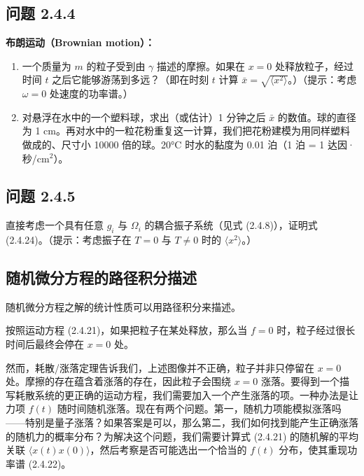 \subsection*{问题 2.4.4}

\textbf{布朗运动（Brownian motion）：}
\begin{enumerate}
\item[(a)] 一个质量为 $m$ 的粒子受到由 $\gamma$ 描述的摩擦。如果在 $x = 0$ 处释放粒子，经过时间 $t$ 之后它能够游荡到多远？（即在时刻 $t$ 计算 $\bar{x} = \sqrt{\langle x^2\rangle}$。）（提示：考虑 $\omega = 0$ 处速度的功率谱。）
\item[(b)] 对悬浮在水中的一个塑料球，求出（或估计）1 分钟之后 $\bar{x}$ 的数值。球的直径为 1 cm。再对水中的一粒花粉重复这一计算，我们把花粉建模为用同样塑料做成的、尺寸小 10000 倍的球。20°C 时水的黏度为 0.01 泊（1 泊 = 1 达因·秒/cm$^2$）。
\end{enumerate}

\subsection*{问题 2.4.5}

直接考虑一个具有任意 $g_i$ 与 $\Omega_i$ 的耦合振子系统（见式 (2.4.8)），证明式 (2.4.24)。（提示：考虑振子在 $T = 0$ 与 $T \neq 0$ 时的 $\langle x^2\rangle$。）

\subsection{随机微分方程的路径积分描述}

\begin{keypoints}
\item 随机微分方程之解的统计性质可以用路径积分来描述。
\end{keypoints}

按照运动方程 (2.4.21)，如果把粒子在某处释放，那么当 $f = 0$ 时，粒子经过很长时间后最终会停在 $x = 0$ 处。

然而，耗散/涨落定理告诉我们，上述图像并不正确，粒子并非只停留在 $x = 0$ 处。摩擦的存在蕴含着涨落的存在，因此粒子会围绕 $x = 0$ 涨落。要得到一个描写耗散系统的更正确的运动方程，我们需要加入一个产生涨落的项。一种办法是让力项 $f(t)$ 随时间随机涨落。现在有两个问题。第一，随机力项能模拟涨落吗——特别是量子涨落？如果答案是可以，那么第二，我们如何找到能产生正确涨落的随机力的概率分布？为解决这个问题，我们需要计算式 (2.4.21) 的随机解的平均关联 $\langle x(t)x(0)\rangle$，然后考察是否可能选出一个恰当的 $f(t)$ 分布，使其重现功率谱 (2.4.22)。

